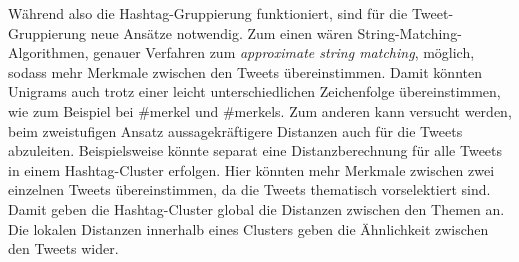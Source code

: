 Während also die Hashtag-Gruppierung funktioniert, sind für die Tweet-Gruppierung neue Ansätze notwendig. Zum einen wären String-Matching-Algorithmen, genauer Verfahren zum \glqq \textit{approximate string matching}\grqq{}, möglich, sodass mehr Merkmale zwi\-schen den Tweets übereinstimmen. Damit könnten Unigrams auch trotz einer leicht unterschiedlichen Zeichenfolge übereinstimmen, wie zum Beispiel bei \glqq \#merkel\grqq{} und \glqq \#merkels\grqq{}. 
Zum anderen kann versucht werden, beim zweistufigen Ansatz aussagekräftigere Distanzen auch für die Tweets abzuleiten. Beispielsweise könnte separat eine Distanzberechnung für alle Tweets in einem Hashtag-Cluster erfolgen. Hier könnten mehr Merkmale zwi\-schen zwei einzelnen Tweets übereinstimmen, da die Tweets thematisch vorselektiert sind. Damit geben die Hashtag-Cluster global die Distanzen zwi\-schen den Themen an. Die lokalen Distanzen innerhalb eines Clusters geben die Ähnlichkeit zwi\-schen den Tweets wider.
%
